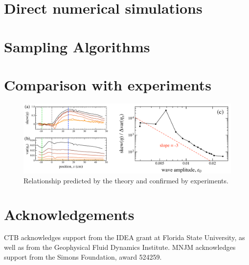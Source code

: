 \documentclass[11pt]{article}
\newcommand{\vsp}[1]{\vspace{#1 pc} \noindent}
\begin{document}
\vsp{10}
\section{Direct numerical simulations}

\section{Sampling Algorithms}


\section{Comparison with experiments}

\begin{figure}%
\begin{center}
\includegraphics[width = 0.99 \linewidth]{Figs/SkewRat.pdf}
\caption{
Relationship predicted by the theory and confirmed by experiments.
}
\label{AAA}
\end{center}
\end{figure}

\section*{Acknowledgements}
CTB acknowledges support from the IDEA grant at Florida State University, as well as from the Geophysical Fluid Dynamics Institute. 
MNJM acknowledges support from the Simons Foundation, award 524259. 



\end{document}

